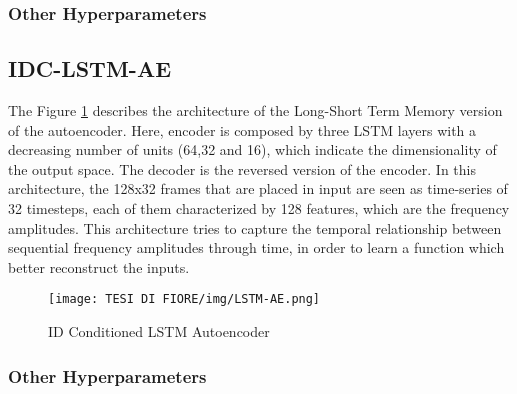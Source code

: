 \subsubsection{Other Hyperparameters}

\subsection{IDC-LSTM-AE}
The Figure \ref{LSTM-AE} describes the architecture of the Long-Short Term Memory version of the autoencoder. Here, encoder is composed by three LSTM layers with a decreasing number of units (64,32 and 16), which indicate the dimensionality of the output space. The decoder is the reversed version of the encoder. In this architecture, the 128x32 frames that are placed in input are seen as time-series of 32 timesteps, each of them characterized by 128 features, which are the frequency amplitudes. This architecture tries to capture the temporal relationship between sequential frequency amplitudes through time, in order to learn a function which better reconstruct the inputs.
\begin{figure}[ht]
\texttt{[image: TESI DI FIORE/img/LSTM-AE.png]}
\centering
\caption{ID Conditioned LSTM Autoencoder}
\label{LSTM-AE}
\end{figure}

\subsubsection{Other Hyperparameters}

